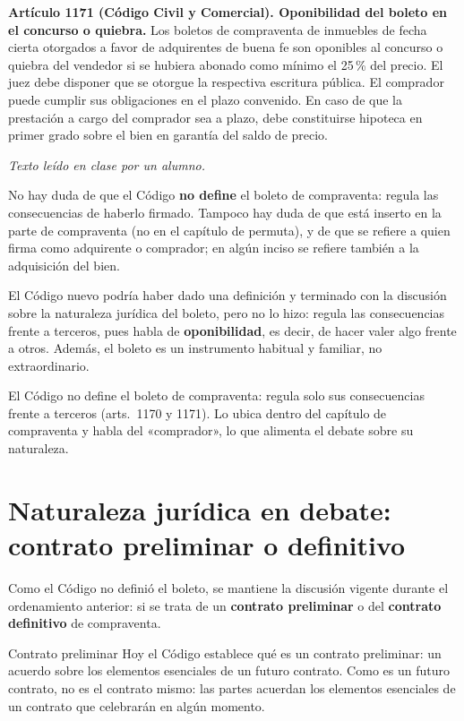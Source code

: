 \documentclass[12pt,oneside]{book}
\begin{document}
\begin{note}
\textbf{Artículo 1171 (Código Civil y Comercial). Oponibilidad del boleto en el concurso o quiebra.} Los boletos de compraventa de inmuebles de fecha cierta otorgados a favor de adquirentes de buena fe son oponibles al concurso o quiebra del vendedor si se hubiera abonado como mínimo el 25\,\% del precio. El juez debe disponer que se otorgue la respectiva escritura pública. El comprador puede cumplir sus obligaciones en el plazo convenido. En caso de que la prestación a cargo del comprador sea a plazo, debe constituirse hipoteca en primer grado sobre el bien en garantía del saldo de precio.

\emph{Texto leído en clase por un alumno.}
\end{note}

No hay duda de que el Código \textbf{no define} el boleto de compraventa: regula las consecuencias de haberlo firmado. Tampoco hay duda de que está inserto en la parte de compraventa (no en el capítulo de permuta), y de que se refiere a quien firma como adquirente o comprador; en algún inciso se refiere también a la adquisición del bien.

El Código nuevo podría haber dado una definición y terminado con la discusión sobre la naturaleza jurídica del boleto, pero no lo hizo: regula las consecuencias frente a terceros, pues habla de \textbf{oponibilidad}, es decir, de hacer valer algo frente a otros. Además, el boleto es un instrumento habitual y familiar, no extraordinario.

\begin{important}
El Código no define el boleto de compraventa: regula solo sus consecuencias frente a terceros (arts.~1170 y 1171). Lo ubica dentro del capítulo de compraventa y habla del «comprador», lo que alimenta el debate sobre su naturaleza.
\end{important}

\section{Naturaleza jurídica en debate: contrato preliminar o definitivo}

Como el Código no definió el boleto, se mantiene la discusión vigente durante el ordenamiento anterior: si se trata de un \textbf{contrato preliminar} o del \textbf{contrato definitivo} de compraventa.

\begin{definition}{Contrato preliminar}
Hoy el Código establece qué es un contrato preliminar: un acuerdo sobre los elementos esenciales de un futuro contrato. Como es un futuro contrato, no es el contrato mismo: las partes acuerdan los elementos esenciales de un contrato que celebrarán en algún momento.
\end{definition}
\end{document}
